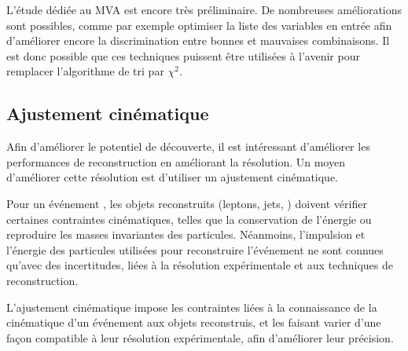 \bigskip

L'étude dédiée au MVA est encore très préliminaire. De nombreuses améliorations sont possibles, comme par exemple optimiser la liste des variables en entrée afin d'améliorer encore la discrimination entre bonnes et mauvaises combinaisons. Il est donc possible que ces techniques puissent être utilisées à l'avenir pour remplacer l'algorithme de tri par $\chi^2$.

\subsection{Ajustement cinématique} \label{sec:mtt_kf}

Afin d'améliorer le potentiel de découverte, il est intéressant d'améliorer les performances de reconstruction en améliorant la résolution. Un moyen d'améliorer cette résolution est d'utiliser un ajustement cinématique.

\bigskip

Pour un événement \ttbar, les objets reconstruits (leptons, jets, \met) doivent vérifier certaines contraintes cinématiques, telles que la conservation de l'énergie ou reproduire les masses invariantes des particules. Néanmoins, l'impulsion et l'énergie des particules utilisées pour reconstruire l'événement \ttbar ne sont connues qu'avec des incertitudes, liées à la résolution expérimentale et aux techniques de reconstruction.

\medskip

L'ajustement cinématique impose les contraintes liées à la connaissance de la cinématique d'un événement \ttbar aux objets reconstruis, et les faisant varier d'une façon compatible à leur résolution expérimentale, afin d'améliorer leur précision.

